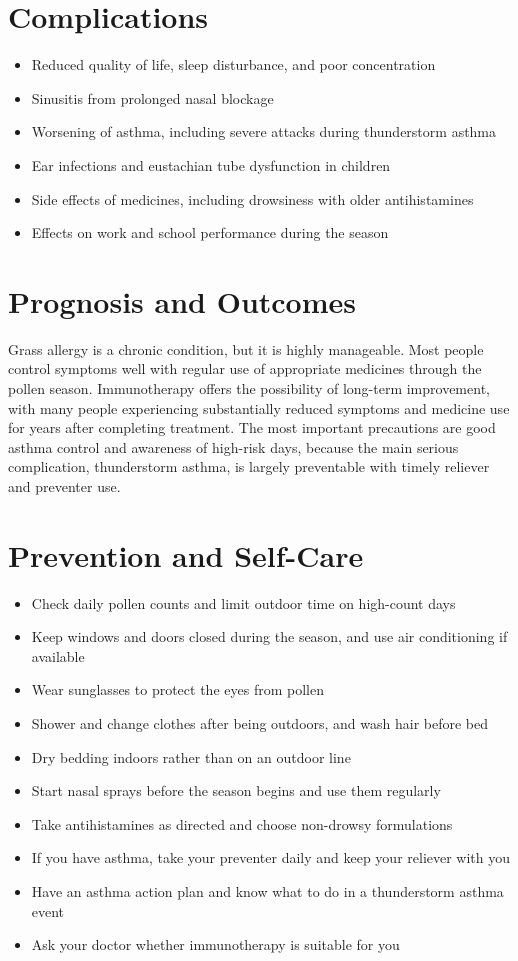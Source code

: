 \section*{Complications}
\begin{itemize}
    \item Reduced quality of life, sleep disturbance, and poor concentration
    \item Sinusitis from prolonged nasal blockage
    \item Worsening of asthma, including severe attacks during thunderstorm asthma
    \item Ear infections and eustachian tube dysfunction in children
    \item Side effects of medicines, including drowsiness with older antihistamines
    \item Effects on work and school performance during the season
\end{itemize}

\section*{Prognosis and Outcomes}
Grass allergy is a chronic condition, but it is highly manageable. Most people control symptoms well with regular use of appropriate medicines through the pollen season. Immunotherapy offers the possibility of long-term improvement, with many people experiencing substantially reduced symptoms and medicine use for years after completing treatment. The most important precautions are good asthma control and awareness of high-risk days, because the main serious complication, thunderstorm asthma, is largely preventable with timely reliever and preventer use.

\section*{Prevention and Self-Care}
\begin{itemize}
    \item Check daily pollen counts and limit outdoor time on high-count days
    \item Keep windows and doors closed during the season, and use air conditioning if available
    \item Wear sunglasses to protect the eyes from pollen
    \item Shower and change clothes after being outdoors, and wash hair before bed
    \item Dry bedding indoors rather than on an outdoor line
    \item Start nasal sprays before the season begins and use them regularly
    \item Take antihistamines as directed and choose non-drowsy formulations
    \item If you have asthma, take your preventer daily and keep your reliever with you
    \item Have an asthma action plan and know what to do in a thunderstorm asthma event
    \item Ask your doctor whether immunotherapy is suitable for you
\end{itemize}

